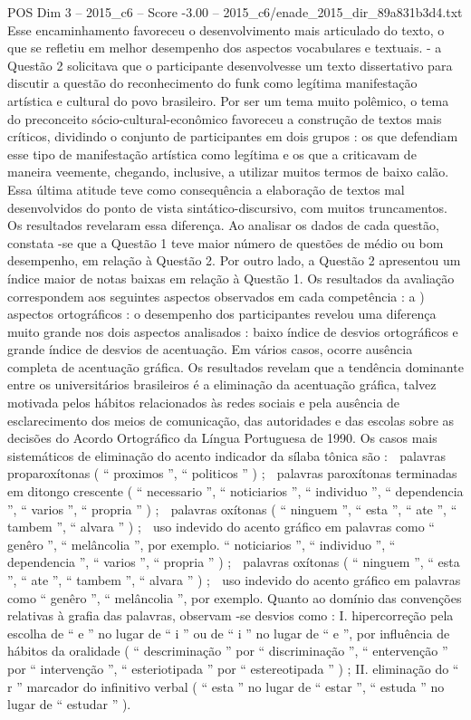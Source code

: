 \begin{textsample}{POS Dim 3 – 2015\_c6 – Score -3.00 – 2015\_c6/enade\_2015\_dir\_89a831b3d4.txt}
Esse encaminhamento favoreceu o desenvolvimento mais articulado do texto, o que se refletiu em melhor desempenho dos aspectos vocabulares e textuais. - a Questão 2 solicitava que o participante desenvolvesse um texto dissertativo para discutir a questão do reconhecimento do funk como legítima manifestação artística e cultural do povo brasileiro.
Por ser um tema muito polêmico, o tema do preconceito sócio-cultural-econômico favoreceu a construção de textos mais críticos, dividindo o conjunto de participantes em dois grupos : os que defendiam esse tipo de manifestação artística como legítima e os que a criticavam de maneira veemente, chegando, inclusive, a utilizar muitos termos de baixo calão.
Essa última atitude teve como consequência a elaboração de textos mal desenvolvidos do ponto de vista sintático-discursivo, com muitos truncamentos.
Os resultados revelaram essa diferença.
Ao analisar os dados de cada questão, constata -se que a Questão 1 teve maior número de questões de médio ou bom desempenho, em relação à Questão 2.
Por outro lado, a Questão 2 apresentou um índice maior de notas baixas em relação à Questão 1.
Os resultados da avaliação correspondem aos seguintes aspectos observados em cada competência : a ) aspectos ortográficos : o desempenho dos participantes revelou uma diferença muito grande nos dois aspectos analisados : baixo índice de desvios ortográficos e grande índice de desvios de acentuação.
Em vários casos, ocorre ausência completa de acentuação gráfica.
Os resultados revelam que a tendência dominante entre os universitários brasileiros é a eliminação da acentuação gráfica, talvez motivada pelos hábitos relacionados às redes sociais e pela ausência de esclarecimento dos meios de comunicação, das autoridades e das escolas sobre as decisões do Acordo Ortográfico da Língua Portuguesa de 1990.
Os casos mais sistemáticos de eliminação do acento indicador da sílaba tônica são :  palavras proparoxítonas ( “ proximos ”, “ politicos ” ) ;  palavras paroxítonas terminadas em ditongo crescente ( “ necessario ”, “ noticiarios ”, “ individuo ”, “ dependencia ”, “ varios ”, “ propria ” ) ;  palavras oxítonas ( “ ninguem ”, “ esta ”, “ ate ”, “ tambem ”, “ alvara ” ) ;  uso indevido do acento gráfico em palavras como “ genêro ”, “ melâncolia ”, por exemplo. “ noticiarios ”, “ individuo ”, “ dependencia ”, “ varios ”, “ propria ” ) ;  palavras oxítonas ( “ ninguem ”, “ esta ”, “ ate ”, “ tambem ”, “ alvara ” ) ;  uso indevido do acento gráfico em palavras como “ genêro ”, “ melâncolia ”, por exemplo.
Quanto ao domínio das convenções relativas à grafia das palavras, observam -se desvios como : I. hipercorreção pela escolha de “ e ” no lugar de “ i ” ou de “ i ” no lugar de “ e ”, por influência de hábitos da oralidade ( “ descriminação ” por “ discriminação ”, “ entervenção ” por “ intervenção ”, “ esteriotipada ” por “ estereotipada ” ) ; II. eliminação do “ r ” marcador do infinitivo verbal ( “ esta ” no lugar de “ estar ”, “ estuda ” no lugar de “ estudar ” ).

\end{textsample}
